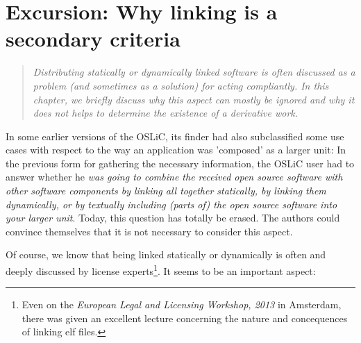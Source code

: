 %
%
%
%
%



\section{Excursion: Why linking is a secondary criteria}
\label{sec:LinkingSecondary}
\footnotesize
\begin{quote}\itshape
Distributing statically or dynamically linked software is often discussed as a
problem (and sometimes as a solution) for acting compliantly. In this chapter,
we briefly discuss why this aspect can mostly be ignored and why it does not
helps to determine the existence of a derivative work.
\end{quote}
\normalsize

In some earlier versions of the OSLiC, its finder had also subclassified some
use cases with respect to the way an application was 'composed' as a larger
unit: In the previous form for gathering the necessary information, the OSLiC
user had to answer whether he \emph{was going to combine the received open
source software with other software components by linking all together
statically, by linking them dynamically, or by textually including (parts of)
the open source software into your larger unit}. Today, this question has
totally be erased. The authors could convince themselves that it is not
necessary to consider this aspect.

Of course, we know that being linked statically or dynamically is often and
deeply discussed by license experts\footnote{Even on the \emph{European Legal
and Licensing Workshop, 2013} in Amsterdam, there was given an excellent lecture
concerning the nature and concequences of linking elf files.}. It seems to be an
important aspect:

